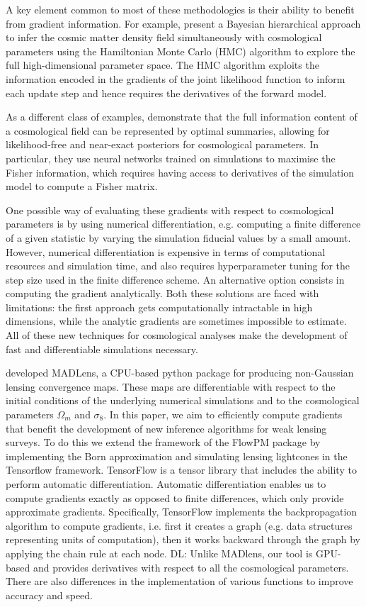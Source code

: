 \documentclass[twocolumn,twocolappendix]{aastex63}
\newcommand{\denise}[1]{{\color{red}DL: #1}}
\begin{document}
A key element common to most of these methodologies is their ability to benefit from gradient information. 
For example, \cite{porqueres2021bayesian} present a Bayesian hierarchical approach to infer the cosmic matter density field simultaneously with cosmological parameters using the Hamiltonian Monte Carlo (HMC) algorithm to explore the full high-dimensional parameter space. The HMC algorithm exploits the information encoded in the gradients of the joint likelihood function to inform each update step and hence requires the derivatives of the forward model. 

 As a different class of examples, \cite{makinen2021lossless} demonstrate that the full information content of a cosmological field can be represented by optimal summaries, allowing for likelihood-free and near-exact posteriors for cosmological parameters. In particular, they use neural networks trained on simulations to maximise the Fisher information, which requires having access to derivatives of the simulation model to compute a Fisher matrix.  

One possible way of evaluating these gradients with respect to cosmological parameters is by using numerical differentiation, e.g. computing a finite difference of a given statistic by varying the simulation fiducial values by a small amount.
However, numerical differentiation is expensive in terms of computational resources and simulation time, and also requires hyperparameter tuning for the step size used in the finite difference scheme. An alternative option consists in computing the gradient analytically. Both these solutions are faced with limitations: the first approach gets computationally intractable in high dimensions, while the analytic gradients are sometimes impossible to estimate.
All of these new techniques for cosmological analyses make the development of fast and differentiable simulations necessary.

\cite{bohm2021madlens} developed MADLens, a CPU-based python package for producing non-Gaussian lensing convergence maps. These maps are differentiable with respect to the initial conditions of the underlying numerical simulations and to the cosmological parameters $\Omega_m$ and $\sigma_8$. In this paper,  we aim to efficiently compute gradients that benefit the development of new inference algorithms for weak lensing surveys. To do this we extend the framework of the FlowPM package \cite{modi2021flowpm} by implementing the Born approximation and simulating lensing lightcones in the Tensorflow framework. TensorFlow is a tensor library that includes the ability to perform automatic differentiation. Automatic differentiation enables us to compute gradients exactly as opposed to finite differences, which only provide approximate gradients. Specifically, TensorFlow implements the backpropagation algorithm to compute gradients, i.e. first it creates a graph (e.g. data structures representing units of computation), then it works backward through the graph by applying the chain rule at each node. \denise{Unlike MADlens, our tool is GPU-based and provides derivatives with respect to all the cosmological parameters. There are also differences in the implementation of various functions to improve accuracy and speed.}
\end{document}
